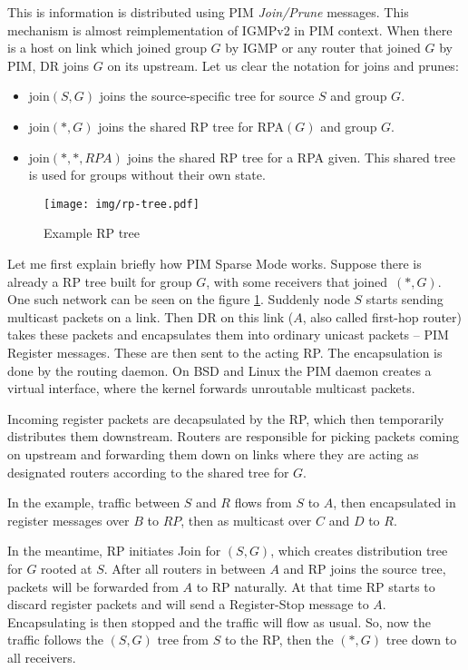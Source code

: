 This is information is distributed using PIM \emph{Join/Prune} messages. This
mechanism is almost reimplementation of IGMPv2 in PIM context. When there is
a host on link which joined group $G$ by IGMP or any router that joined $G$ by
PIM, DR joins $G$ on its upstream. Let us clear the notation for joins and prunes:

\begin{itemize}
  \item join$(S, G)$ joins the source-specific tree for source $S$ and group $G$.
  \item join$(*, G)$ joins the shared RP tree for RPA$(G)$ and group $G$.
  \item join$(*, *, RPA)$ joins the shared RP tree for a RPA given. This shared
    tree is used for groups without their own state.
\end{itemize}

\begin{figure}[htp]
\centering
\texttt{[image: img/rp-tree.pdf]}
\caption{Example RP tree}
\label{rp-tree}
\end{figure}

Let me first explain briefly how PIM Sparse Mode works. Suppose there is
already a RP tree built for group $G$, with some receivers that joined~$(*,G)$.
One such network can be seen on the figure \ref{rp-tree}.
Suddenly node $S$ starts sending multicast packets on a link. Then DR on
this link ($A$, also called first-hop router) takes these packets and
encapsulates them into ordinary unicast packets -- PIM Register messages. These
are then sent to the acting RP. The encapsulation is done by the routing
daemon. On BSD and Linux the PIM daemon creates a virtual interface, where the
kernel forwards unroutable multicast packets.

Incoming register packets are decapsulated by the RP, which then temporarily
distributes them downstream. Routers are responsible for picking packets coming
on upstream and forwarding them down on links where they are acting as
designated routers according to the shared tree for $G$.

In the example, traffic between $S$ and $R$ flows from $S$ to $A$, then
encapsulated in register messages over $B$ to $RP$, then as multicast over $C$
and $D$ to $R$.

In the meantime, RP initiates Join for $(S, G)$, which creates distribution
tree for $G$ rooted at $S$. After all routers in between $A$ and RP joins the
source tree, packets will be forwarded from $A$ to RP naturally. At that time
RP starts to discard register packets and will send a Register-Stop message to
$A$. Encapsulating is then stopped and the traffic will flow as usual. So, now
the traffic follows the $(S,G)$ tree from $S$ to the RP, then the $(*,G)$ tree
down to all receivers.

